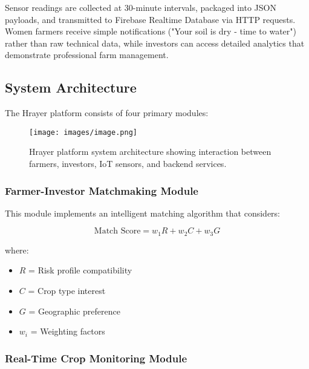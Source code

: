 \documentclass[9pt,twocolumn,twoside]{article}
\begin{document}
Sensor readings are collected at 30-minute intervals, packaged into JSON payloads, and transmitted to Firebase Realtime Database via HTTP requests. Women farmers receive simple notifications ("Your soil is dry - time to water") rather than raw technical data, while investors can access detailed analytics that demonstrate professional farm management.

\subsection{System Architecture}

The Hrayer platform consists of four primary modules:

\begin{figure}[H]
\centering
\texttt{[image: images/image.png]}
\caption{Hrayer platform system architecture showing interaction between farmers, investors, IoT sensors, and backend services.}
\label{fig:architecture}
\end{figure}

\subsubsection{Farmer-Investor Matchmaking Module}

This module implements an intelligent matching algorithm that considers:

\begin{equation}
    \text{Match Score} = w_1 R  + w_2 C + w_3 G
    \label{eq:matching}
\end{equation}

where:
\begin{itemize}
  \item $R$ = Risk profile compatibility
  \item $C$ = Crop type interest
  \item $G$ = Geographic preference
  \item $w_i$ = Weighting factors
\end{itemize}

\subsubsection{Real-Time Crop Monitoring Module}
\end{document}
